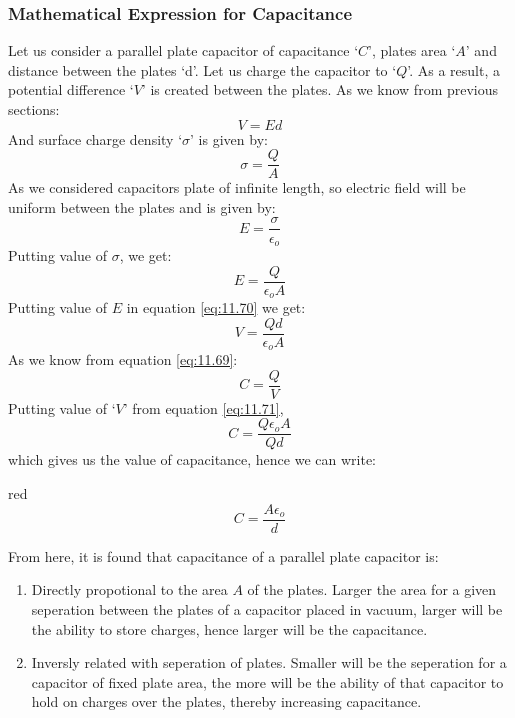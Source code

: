 \subsubsection{Mathematical Expression for Capacitance}
Let us consider a parallel plate capacitor of capacitance `$C$',
plates area `$A$' and distance between the plates `d’. Let us charge the
capacitor to `$Q$'. As a result, a potential difference `$V$'
is created between the plates. 
As we know from previous sections:
\begin{equation}\label{eq:11.70}
  V = Ed
\end{equation}
And surface charge density `$\sigma$' is given by:
\begin{equation}\nonumber
  \sigma = \frac{Q}{A}
\end{equation}
As we considered capacitors plate of infinite length, so 
electric field will be uniform between the plates and is given by:
\begin{equation}\nonumber
  E = \frac{\sigma}{\epsilon_{o}}
\end{equation}
Putting value of $\sigma$, we get:
\begin{equation}\nonumber
  E = \frac{Q}{\epsilon_{o}A}
\end{equation}
Putting value of $E$ in equation \ref{eq:11.70} we get:
\begin{equation}\label{eq:11.71}
  V = \frac{Qd}{\epsilon_{o}A}
\end{equation}
As we know from equation \ref{eq:11.69}:
\begin{equation}\nonumber
  C =  \frac{Q}{V}
\end{equation}
Putting value of `$V$' from equation \ref{eq:11.71}, 
\begin{equation}\nonumber
  C =  \frac{Q\epsilon_{o}A}{Qd}
\end{equation}
which gives us the value of capacitance,
hence we can write:
\begin{mybox}{red}{}
  \begin{equation}\label{eq:11.72}
    C =  \frac{A\epsilon_{o}}{d}
  \end{equation}
\end{mybox}
\noindent From here, it is found that capacitance of a parallel plate capacitor is:
\begin{enumerate}[label = (\alph*)]
\item Directly propotional to the area $A$ of the plates. Larger the area for a
given seperation between the plates of a capacitor placed in vacuum,
larger will be the ability to store charges, hence larger will be
the capacitance.
\item Inversly related with seperation of plates. Smaller will be the seperation
for a capacitor of fixed plate area, the more will be the ability of that
capacitor to hold on charges over the plates,
thereby increasing capacitance.
\end{enumerate}
